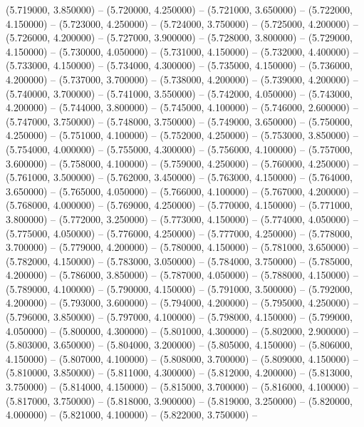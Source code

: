 (5.719000, 3.850000) -- 
(5.720000, 4.250000) -- 
(5.721000, 3.650000) -- 
(5.722000, 4.150000) -- 
(5.723000, 4.250000) -- 
(5.724000, 3.750000) -- 
(5.725000, 4.200000) -- 
(5.726000, 4.200000) -- 
(5.727000, 3.900000) -- 
(5.728000, 3.800000) -- 
(5.729000, 4.150000) -- 
(5.730000, 4.050000) -- 
(5.731000, 4.150000) -- 
(5.732000, 4.400000) -- 
(5.733000, 4.150000) -- 
(5.734000, 4.300000) -- 
(5.735000, 4.150000) -- 
(5.736000, 4.200000) -- 
(5.737000, 3.700000) -- 
(5.738000, 4.200000) -- 
(5.739000, 4.200000) -- 
(5.740000, 3.700000) -- 
(5.741000, 3.550000) -- 
(5.742000, 4.050000) -- 
(5.743000, 4.200000) -- 
(5.744000, 3.800000) -- 
(5.745000, 4.100000) -- 
(5.746000, 2.600000) -- 
(5.747000, 3.750000) -- 
(5.748000, 3.750000) -- 
(5.749000, 3.650000) -- 
(5.750000, 4.250000) -- 
(5.751000, 4.100000) -- 
(5.752000, 4.250000) -- 
(5.753000, 3.850000) -- 
(5.754000, 4.000000) -- 
(5.755000, 4.300000) -- 
(5.756000, 4.100000) -- 
(5.757000, 3.600000) -- 
(5.758000, 4.100000) -- 
(5.759000, 4.250000) -- 
(5.760000, 4.250000) -- 
(5.761000, 3.500000) -- 
(5.762000, 3.450000) -- 
(5.763000, 4.150000) -- 
(5.764000, 3.650000) -- 
(5.765000, 4.050000) -- 
(5.766000, 4.100000) -- 
(5.767000, 4.200000) -- 
(5.768000, 4.000000) -- 
(5.769000, 4.250000) -- 
(5.770000, 4.150000) -- 
(5.771000, 3.800000) -- 
(5.772000, 3.250000) -- 
(5.773000, 4.150000) -- 
(5.774000, 4.050000) -- 
(5.775000, 4.050000) -- 
(5.776000, 4.250000) -- 
(5.777000, 4.250000) -- 
(5.778000, 3.700000) -- 
(5.779000, 4.200000) -- 
(5.780000, 4.150000) -- 
(5.781000, 3.650000) -- 
(5.782000, 4.150000) -- 
(5.783000, 3.050000) -- 
(5.784000, 3.750000) -- 
(5.785000, 4.200000) -- 
(5.786000, 3.850000) -- 
(5.787000, 4.050000) -- 
(5.788000, 4.150000) -- 
(5.789000, 4.100000) -- 
(5.790000, 4.150000) -- 
(5.791000, 3.500000) -- 
(5.792000, 4.200000) -- 
(5.793000, 3.600000) -- 
(5.794000, 4.200000) -- 
(5.795000, 4.250000) -- 
(5.796000, 3.850000) -- 
(5.797000, 4.100000) -- 
(5.798000, 4.150000) -- 
(5.799000, 4.050000) -- 
(5.800000, 4.300000) -- 
(5.801000, 4.300000) -- 
(5.802000, 2.900000) -- 
(5.803000, 3.650000) -- 
(5.804000, 3.200000) -- 
(5.805000, 4.150000) -- 
(5.806000, 4.150000) -- 
(5.807000, 4.100000) -- 
(5.808000, 3.700000) -- 
(5.809000, 4.150000) -- 
(5.810000, 3.850000) -- 
(5.811000, 4.300000) -- 
(5.812000, 4.200000) -- 
(5.813000, 3.750000) -- 
(5.814000, 4.150000) -- 
(5.815000, 3.700000) -- 
(5.816000, 4.100000) -- 
(5.817000, 3.750000) -- 
(5.818000, 3.900000) -- 
(5.819000, 3.250000) -- 
(5.820000, 4.000000) -- 
(5.821000, 4.100000) -- 
(5.822000, 3.750000) -- 
